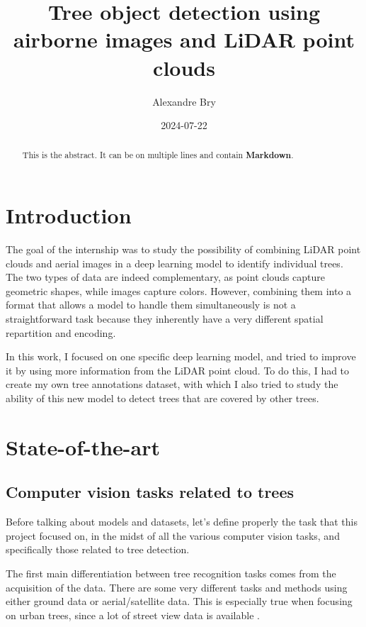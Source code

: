 \documentclass[
]{report}
\title{Tree object detection using airborne images and LiDAR point
clouds}
\author{Alexandre Bry}
\date{2024-07-22}
\renewcommand*\contentsname{Table of contents}
\newcommand\contentsname{Table of contents}
\begin{document}
\maketitle
\begin{abstract}
This is the abstract. It can be on multiple lines and contain
\textbf{Markdown}.
\end{abstract}

\renewcommand*\contentsname{Table of contents}
{
\hypersetup{linkcolor=}
\setcounter{tocdepth}{2}
\tableofcontents
}

\chapter*{Introduction}\label{introduction}

The goal of the internship was to study the possibility of combining
LiDAR point clouds and aerial images in a deep learning model to
identify individual trees. The two types of data are indeed
complementary, as point clouds capture geometric shapes, while images
capture colors. However, combining them into a format that allows a
model to handle them simultaneously is not a straightforward task
because they inherently have a very different spatial repartition and
encoding.

In this work, I focused on one specific deep learning model, and tried
to improve it by using more information from the LiDAR point cloud. To
do this, I had to create my own tree annotations dataset, with which I
also tried to study the ability of this new model to detect trees that
are covered by other trees.

\chapter{State-of-the-art}\label{state-of-the-art}

\section{Computer vision tasks related to
trees}\label{computer-vision-tasks-related-to-trees}

Before talking about models and datasets, let's define properly the task
that this project focused on, in the midst of all the various computer
vision tasks, and specifically those related to tree detection.

The first main differentiation between tree recognition tasks comes from
the acquisition of the data. There are some very different tasks and
methods using either ground data or aerial/satellite data. This is
especially true when focusing on urban trees, since a lot of street view
data is available \autocite{urban-trees}.
\end{document}
